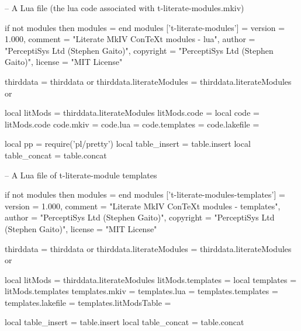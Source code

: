 \usemodule[t-contests]

\unprotect

\stopMkIVCode

\startLuaCode
-- A Lua file (the lua code associated with t-literate-modules.mkiv)

if not modules then modules = { } end modules ['t-literate-modules'] = {
    version   = 1.000,
    comment   = "Literate MkIV ConTeXt modules - lua",
    author    = "PerceptiSys Ltd (Stephen Gaito)",
    copyright = "PerceptiSys Ltd (Stephen Gaito)",
    license   = "MIT License"
}

thirddata                 = thirddata                 or {}
thirddata.literateModules = thirddata.literateModules or {}

local litMods  = thirddata.literateModules
litMods.code   = {}
local code     = litMods.code
code.mkiv      = {}
code.lua       = {}
code.templates = {}
code.lakefile  = {}

local pp = require('pl/pretty')
local table_insert = table.insert
local table_concat = table.concat
\stopLuaCode

\startLuaTemplate
-- A Lua file of t-literate-module templates

if not modules then modules = { } end modules ['t-literate-modules-templates'] = {
    version   = 1.000,
    comment   = "Literate MkIV ConTeXt modules - templates",
    author    = "PerceptiSys Ltd (Stephen Gaito)",
    copyright = "PerceptiSys Ltd (Stephen Gaito)",
    license   = "MIT License"
}

thirddata                 = thirddata                 or {}
thirddata.literateModules = thirddata.literateModules or {}

local litMods          = thirddata.literateModules
litMods.templates      = {}
local templates        = litMods.templates
templates.mkiv         = {}
templates.lua          = {}
templates.templates    = {}
templates.lakefile     = {}
templates.litModsTable = {}

local table_insert = table.insert
local table_concat = table.concat

\stopLuaTemplate

\stopchapter